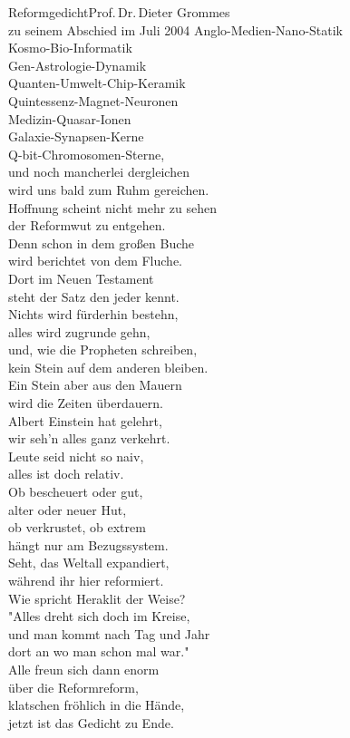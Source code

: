 \begin{lied*}{Reformgedicht}{Prof.\,Dr.\,Dieter Grommes\\zu seinem Abschied im Juli 2004}
Anglo-Medien-Nano-Statik\\
Kosmo-Bio-Informatik\\
Gen-Astrologie-Dynamik\\
Quanten-Umwelt-Chip-Keramik\\
Quintessenz-Magnet-Neuronen\\
Medizin-Quasar-Ionen\\
Galaxie-Synapsen-Kerne\\
Q-bit-Chromosomen-Sterne,\\
und noch mancherlei dergleichen\\
wird uns bald zum Ruhm gereichen.\\

Hoffnung scheint nicht mehr zu sehen\\
der Reformwut zu entgehen.\\
Denn schon in dem großen Buche\\
wird berichtet von dem Fluche.\\
Dort im Neuen Testament\\
steht der Satz den jeder kennt.\\
Nichts wird fürderhin bestehn,\\
alles wird zugrunde gehn,\\
und, wie die Propheten schreiben,\\
kein Stein auf dem anderen bleiben.\\

Ein Stein aber aus den Mauern\\
wird die Zeiten überdauern.\\
Albert Einstein hat gelehrt,\\
wir seh'n alles ganz verkehrt.\\
Leute seid nicht so naiv,\\
alles ist doch relativ.\\
Ob bescheuert oder gut,\\
alter oder neuer Hut,\\
ob verkrustet, ob extrem\\
hängt nur am Bezugssystem.\\

Seht, das Weltall expandiert,\\
während ihr hier reformiert.\\
Wie spricht Heraklit der Weise?\\
"Alles dreht sich doch im Kreise,\\
und man kommt nach Tag und Jahr\\
dort an wo man schon mal war."\\

Alle freun sich dann enorm\\
über die Reformreform,\\
klatschen fröhlich in die Hände,\\
jetzt ist das Gedicht zu Ende.\\
\end{lied*}

